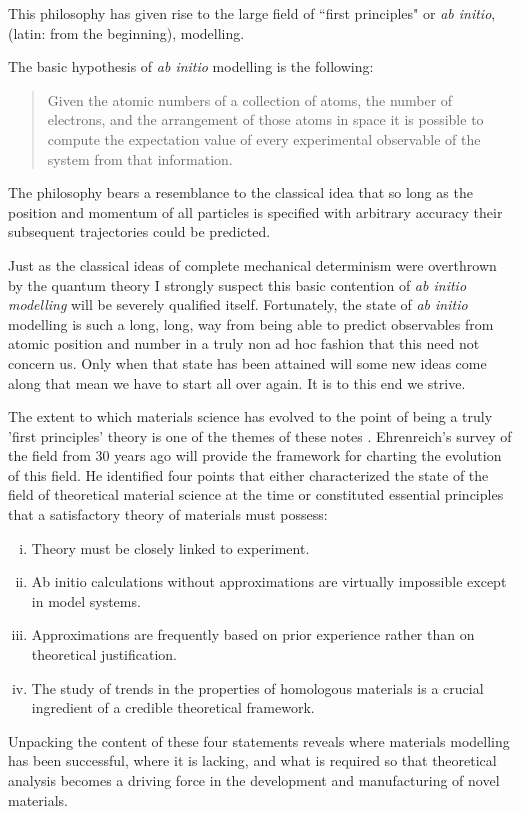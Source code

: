 This philosophy has given rise to the large field of ``first principles" or {\it ab initio}, 
(latin: from the beginning), modelling. 
%

The basic hypothesis of {\it ab initio} modelling is the following:  

\begin{quote}
Given the atomic numbers of a collection of atoms,
the number of electrons, and the arrangement of those atoms 
in space it is possible to compute
the expectation value of every experimental
observable of the system from that information.
\end{quote}

The philosophy bears a resemblance to the classical idea
that so long as the position and momentum of all particles 
is specified with arbitrary accuracy their subsequent 
trajectories could be predicted. 

Just as the classical ideas of complete mechanical determinism were
overthrown by the quantum theory I strongly suspect this
basic contention of {\it ab initio modelling} 
will be severely qualified itself. Fortunately, the 
state of {\it ab initio} modelling is such a long, long, way from being
able to predict observables from atomic position and number
in a truly non ad hoc fashion that this need not concern us. 
Only when that state has been attained
will some new ideas come along that mean 
we have to start all over again. It is to this end we strive.

The extent to which materials science has evolved to the point of being 
a truly 'first principles' theory is one of the themes of 
these notes \cite{finnis12, ismailbeigi2017}.
%
%
Ehrenreich's survey of the field from 30 years ago will provide the framework 
for charting the evolution of this field.
He identified four points that either characterized the state 
of the field of theoretical material science at the time or constituted essential principles 
that a satisfactory theory of materials must possess:
%
\begin{enumerate}[i)]
\label{en:ehrenreich}
\item Theory must be closely linked to experiment.
\item Ab initio calculations without approximations are virtually impossible 
      except in model systems.
\item Approximations are frequently based on prior experience rather 
      than on theoretical justification.
\item The study of trends in the properties of homologous materials 
      is a crucial ingredient of a credible theoretical framework.
\end{enumerate}
%
Unpacking the content of these four statements reveals where 
materials modelling has been successful, where it is lacking,
and what is required so that theoretical analysis becomes a driving
force in the development and manufacturing of novel materials.

